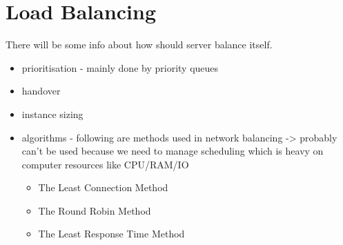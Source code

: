 
\section{Load Balancing}\label{sec:load-balancing}
There will be some info about how should server balance itself.
\begin{itemize}
    \item prioritisation - mainly done by priority queues
    \item handover
    \item instance sizing
    \item algorithms - following are methods used in network balancing -> probably can't be used because we need to manage scheduling
    which is heavy on computer resources like CPU/RAM/IO
    \begin{itemize}
        \item The Least Connection Method
        \item The Round Robin Method
        \item The Least Response Time Method
    \end{itemize}
\end{itemize}